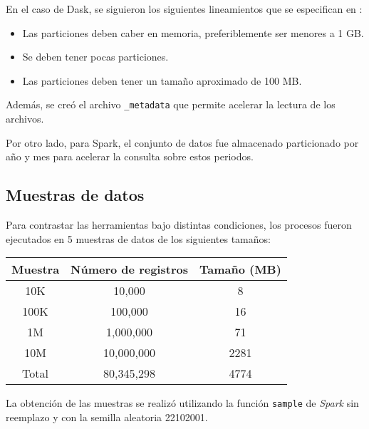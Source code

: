 En el caso de Dask, se siguieron los siguientes lineamientos que se especifican en \cite{daskbestpractices}:
\begin{itemize}
	\item Las particiones deben caber en memoria, preferiblemente ser menores a 1 GB.
	\item Se deben tener pocas particiones.
	\item Las particiones deben tener un tamaño aproximado de 100 MB.
\end{itemize}

Además, se creó el archivo \texttt{\_metadata} que permite acelerar la lectura de los archivos.

Por otro lado, para Spark, el conjunto de datos fue almacenado particionado por año y mes para acelerar la consulta sobre estos periodos.

\subsection{Muestras de datos}

Para contrastar las herramientas bajo distintas condiciones, los procesos fueron ejecutados en 5 muestras de datos de los siguientes tamaños:\\

\begin{center}
\begin{tabular}{|ccc|}
  \hline
 Muestra & Número de registros & Tamaño (MB) \\ 
  \hline
  10K & 10,000 & 8 \\ 
  100K & 100,000 & 16 \\ 
  1M & 1,000,000 & 71 \\ 
  10M & 10,000,000 & 2281 \\ 
  Total & 80,345,298 & 4774 \\ 
   \hline
\end{tabular}
\end{center}

La obtención de las muestras se realizó utilizando la función \texttt{sample} de \textit{Spark} sin reemplazo y con la semilla aleatoria 22102001.